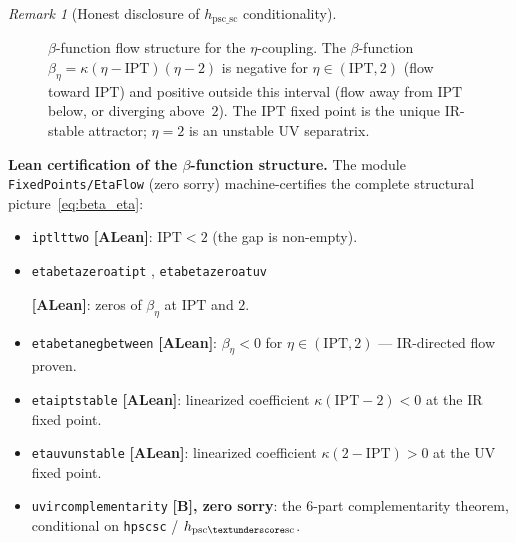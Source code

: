 \documentclass[11pt]{article}
\theoremstyle{remark}
\newtheorem{remark}[theorem]{Remark}
\newcommand{\IPT}{\mathrm{IPT}}
\newcommand{\lean}[1]{%
  \penalty-100
  \begingroup
  \def\_{\textunderscore\allowbreak}%
  \texttt{#1}%
  \endgroup
}
\begin{document}
\begin{remark}[Honest disclosure of $h_{\mathrm{psc\_sc}}$ conditionality]
\begin{figure}[ht]
\centering
{}
\caption{$\beta$-function flow structure for the $\eta$-coupling.
The $\beta$-function $\beta_\eta = \kappa(\eta - \IPT)(\eta - 2)$ is negative
for $\eta \in (\IPT, 2)$ (flow toward $\IPT$) and positive outside this
interval (flow away from $\IPT$ below, or diverging above~$2$).
The $\IPT$ fixed point is the unique IR-stable attractor; $\eta = 2$ is an
unstable UV separatrix.}
\label{fig:eta_flow}
\end{figure}

\textbf{Lean certification of the $\beta$-function structure.}
The module \lean{FixedPoints/EtaFlow} (zero sorry) machine-certifies the complete
structural picture~\eqref{eq:beta_eta}:
\begin{itemize}[leftmargin=2em]
\item \lean{ipt\_lt\_two} \textbf{[A\_Lean]}: $\IPT < 2$ (the gap is non-empty).
\item \lean{eta\_beta\_zero\_at\_ipt}, \lean{eta\_beta\_zero\_at\_uv}
  \textbf{[A\_Lean]}: zeros of $\beta_\eta$ at $\IPT$ and $2$.
\item \lean{eta\_beta\_neg\_between} \textbf{[A\_Lean]}: $\beta_\eta < 0$ for
  $\eta \in (\IPT, 2)$ — IR-directed flow proven.
\item \lean{eta\_ipt\_stable} \textbf{[A\_Lean]}: linearized coefficient
  $\kappa(\IPT - 2) < 0$ at the IR fixed point.
\item \lean{eta\_uv\_unstable} \textbf{[A\_Lean]}: linearized coefficient
  $\kappa(2 - \IPT) > 0$ at the UV fixed point.
\item \lean{uv\_ir\_complementarity} \textbf{[B], zero sorry}: the 6-part
  complementarity theorem, conditional on \lean{h\_psc\_sc} / $h_{\mathrm{psc\_sc}}$.
\end{itemize}


\end{remark}
\end{document}
